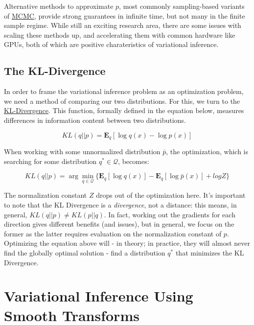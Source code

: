 \documentclass[12pt]{article}
\begin{document}
\noindent Alternative methods to approximate $p$, most commonly sampling-based variants of \href{https://en.wikipedia.org/wiki/Markov_chain_Monte_Carlo}{MCMC}, provide strong guarantees in infinite time, but not many in the finite sample regime. While still an exciting research area, there are some issues with scaling these methods up, and accelerating them with common hardware like GPUs, both of which are positive charateristics of variational inference.

\subsection{The KL-Divergence}

In order to frame the variational inference problem as an optimization problem, we need a method of comparing our two distributions. For this, we turn to the \href{https://timvieira.github.io/blog/post/2014/10/06/kl-divergence-as-an-objective-function/}{KL-Divergence}. This function, formally defined in the equation below, measures differences in information content between two distributions.

\begin{equation}
KL(q || p) = \mathbf{E}_q[\log q(x) - \log p(x)]
\end{equation}

\noindent When working with some unnormalized distribution $\bar p$, the optimization, which is searching for some distribution $ q^* \in \mathcal{Q}$, becomes:

\begin{equation}
KL(q || p) = \arg\min_{q \in \mathcal{Q}} \{ {\mathbf{E}_q[\log q(x)] - \mathbf{E}_q[\log \bar p(x)] + logZ} \}
\end{equation}

\noindent The normalization constant $Z$ drops out of the optimization here. It's important to note that the KL Divergence is a \textit{divergence}, not a distance: this means, in general, $KL(q || p) \neq KL(p || q)$. In fact, working out the gradients for each direction gives different benefits (and issues), but in general, we focus on the former as the latter requires evaluation on the normalization constant of $p$. Optimizing the equation above will - in theory; in practice, they will almost never find the globally optimal solution - find a distribution $q^*$ that minimizes the KL Divergence.

\section{Variational Inference Using Smooth Transforms}
\end{document}
